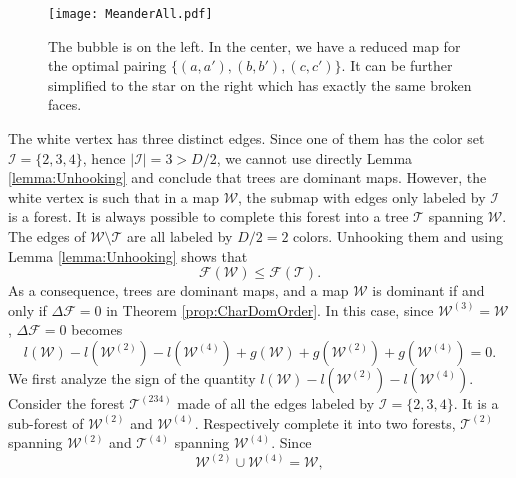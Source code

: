 \documentclass[aps,prd,10pt,notitlepage,nofootinbib,superscriptaddress,showkeys,showpacs]{revtex4-1}
\begin{document}
\begin{figure}
\texttt{[image: MeanderAll.pdf]} 
\caption{\label{fig:Meander} 
The bubble is on the left. In the center, we have a reduced map for the optimal pairing $\{(a,a'), (b,b'), (c,c')\}$. It can be further simplified to the star on the right which has exactly the same broken faces.}
\end{figure}

The white vertex has three distinct edges. Since one of them has the color set ${\mathcal{I}} = \{2, 3, 4\}$, hence $|{\mathcal{I}}|=3>D/2$, we cannot use directly Lemma \ref{lemma:Unhooking} and conclude that trees are dominant maps. However, the white vertex is such that in a map ${\mathcal{W}}$, the submap with edges only labeled by ${\mathcal{I}}$ is a forest. It is always possible to complete this forest into a tree ${\mathcal{T}}$ spanning ${\mathcal{W}}$. The edges of ${\mathcal{W}}\setminus {\mathcal{T}}$ are all labeled by $D/2=2$ colors. Unhooking them and using Lemma \ref{lemma:Unhooking} shows that
\begin{equation}
{\mathcal{F}}({\mathcal{W}}) \leq {\mathcal{F}}({\mathcal{T}}).
\end{equation}
As a consequence, trees are dominant maps, and a map ${\mathcal{W}}$ is dominant if and only if $\Delta{\mathcal{F}}=0$ in Theorem \ref{prop:CharDomOrder}. In this case, since ${\mathcal{W}}^{(3)}={\mathcal{W}}$, $\Delta{\mathcal{F}} =0$ becomes
\begin{equation}
\label{eqref:CharDomOrdMean}
l({\mathcal{W}})-l({\mathcal{W}}^{(2)})-l({\mathcal{W}}^{(4)}) + g({\mathcal{W}}) + g({\mathcal{W}}^{(2)}) + g({\mathcal{W}}^{(4)}) = 0.
\end{equation}
We first analyze the sign of the quantity $l({\mathcal{W}})-l({\mathcal{W}}^{(2)})-l({\mathcal{W}}^{(4)})$. Consider the forest ${\mathcal{T}}^{(234)}$ made of all the edges labeled by ${\mathcal{I}} = \{2, 3, 4\}$. It is a sub-forest of ${\mathcal{W}}^{(2)}$ and ${\mathcal{W}}^{(4)}$. Respectively complete it into two forests, ${\mathcal{T}}^{(2)}$ spanning ${\mathcal{W}}^{(2)}$ and ${\mathcal{T}}^{(4)}$ spanning ${\mathcal{W}}^{(4)}$. Since
\begin{equation}
{\mathcal{W}}^{(2)} \cup {\mathcal{W}}^{(4)} = {\mathcal{W}},
\end{equation}
\end{document}
